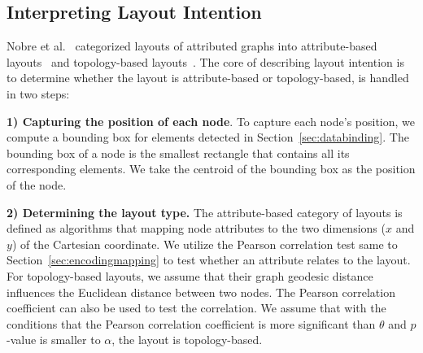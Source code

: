 \subsection{Interpreting Layout Intention}
Nobre et al.~\cite{DBLP:journals/cgf/NobreMSL19} categorized layouts of attributed graphs into attribute-based layouts~\cite{DBLP:journals/tvcg/ElzenW14, DBLP:journals/tvcg/Guo09} and topology-based layouts~\cite{DBLP:journals/spe/FruchtermanR91, DBLP:journals/cgf/KruigerRMKKT17, DBLP:journals/tvcg/GansnerHN13, DBLP:journals/tvcg/ZhuCHHLZ21}.
The core of describing layout intention is to determine whether the layout is attribute-based or topology-based, is handled in two steps: 

\textbf{1) Capturing the position of each node}.
To capture each node's position, we compute a bounding box for elements detected in Section~\ref{sec:databinding}.
The bounding box of a node is the smallest rectangle that contains all its corresponding elements.
We take the centroid of the bounding box as the position of the node.

\textbf{2) Determining the layout type.} 
The attribute-based category of layouts is defined as algorithms that mapping node attributes to the two dimensions ($x$ and $y$) of the Cartesian coordinate. 
We utilize the Pearson correlation test same to Section~\ref{sec:encodingmapping} to test whether an attribute relates to the layout.
For topology-based layouts, we assume that their graph geodesic distance influences the Euclidean distance between two nodes.
The Pearson correlation coefficient can also be used to test the correlation.
We assume that with the conditions that the Pearson correlation coefficient is more significant than $\theta$ and $p$-value is smaller to $\alpha$, the layout is topology-based.

